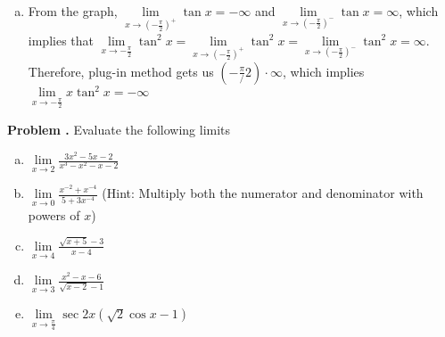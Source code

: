\documentclass[11pt,letterpaper]{article}
\newcounter{problem}
\newcommand{\problem}{
	\stepcounter{problem}%
	\noindent \textbf{Problem \theproblem. }%
}
\begin{document}
\begin{enumerate}[(a)]
    \item From the graph, $\lim\limits_{x \to \left(-\frac{\pi}{2}\right)^+} \tan x = -\infty$ and  $\lim\limits_{x \to \left(-\frac{\pi}{2}\right)^-} \tan x = \infty$, which implies that $\lim\limits_{x \to -\frac{\pi}{2}} \tan^2 x = \lim\limits_{x \to \left(-\frac{\pi}{2}\right)^+} \tan^2 x = \lim\limits_{x \to \left(-\frac{\pi}{2}\right)^-} \tan^2 x = \infty$.  Therefore, plug-in method gets us $\left(-\frac{\pi}/{2}\right)\cdot\infty$, which implies $\lim\limits_{x \to -\frac{\pi}{2}} x \tan^2 x = -\infty$
\end{enumerate}\vspace{6mm}


\problem Evaluate the following limits
\begin{enumerate}[(a)]
    \item $\lim\limits_{x \to 2} \frac{3x^2-5x-2}{x^3-x^2-x-2}$
    \item $\lim\limits_{x \to 0} \frac{x^{-2} + x^{-4}}{5 + 3x^{-4}}$ (Hint: Multiply both the numerator and denominator with powers of $x$)
    \item $\lim\limits_{x \to 4} \frac{\sqrt{x+5}-3}{x-4}$
    \item $\lim\limits_{x \to 3} \frac{x^2-x-6}{\sqrt{x-2}-1}$
    \item $\lim\limits_{x \to \frac{\pi}{4}} \sec{2x}(\sqrt{2}\cos x - 1)$
\end{enumerate}\vspace{6mm}
\end{document}
